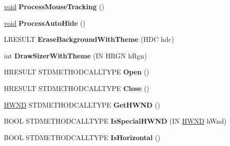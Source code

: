 \begin{DoxyCompactItemize}
\item 
\mbox{\label{class_c_tray_window_a78c47da209667ee22aa8f37245e79d9c}} 
\hyperlink{interfacevoid}{void} {\bfseries Process\+Mouse\+Tracking} ()
\item 
\mbox{\label{class_c_tray_window_af234aabaad01e460a1d97850421ccffd}} 
\hyperlink{interfacevoid}{void} {\bfseries Process\+Auto\+Hide} ()
\item 
\mbox{\label{class_c_tray_window_a6b91f23e171b0f9e7dc3ec6593c77f3f}} 
L\+R\+E\+S\+U\+LT {\bfseries Erase\+Background\+With\+Theme} (H\+DC hdc)
\item 
\mbox{\label{class_c_tray_window_a2fc9c57257b6348dae455052c73c55e5}} 
int {\bfseries Draw\+Sizer\+With\+Theme} (IN H\+R\+GN h\+Rgn)
\item 
\mbox{\label{class_c_tray_window_a8c18e7cf201551bcae86eff56916e9b9}} 
H\+R\+E\+S\+U\+LT S\+T\+D\+M\+E\+T\+H\+O\+D\+C\+A\+L\+L\+T\+Y\+PE {\bfseries Open} ()
\item 
\mbox{\label{class_c_tray_window_a97f14d3b01f3b36c2fc12f6f205ae5ab}} 
H\+R\+E\+S\+U\+LT S\+T\+D\+M\+E\+T\+H\+O\+D\+C\+A\+L\+L\+T\+Y\+PE {\bfseries Close} ()
\item 
\mbox{\label{class_c_tray_window_a2a4bae5fecc2b7fa50a40260f62a0af1}} 
\hyperlink{interfacevoid}{H\+W\+ND} S\+T\+D\+M\+E\+T\+H\+O\+D\+C\+A\+L\+L\+T\+Y\+PE {\bfseries Get\+H\+W\+ND} ()
\item 
\mbox{\label{class_c_tray_window_acb519ca41e849764b02a019a616f4d17}} 
B\+O\+OL S\+T\+D\+M\+E\+T\+H\+O\+D\+C\+A\+L\+L\+T\+Y\+PE {\bfseries Is\+Special\+H\+W\+ND} (IN \hyperlink{interfacevoid}{H\+W\+ND} h\+Wnd)
\item 
\mbox{\label{class_c_tray_window_a3986c53a6d4cc9e150600b764cc2a7f3}} 
B\+O\+OL S\+T\+D\+M\+E\+T\+H\+O\+D\+C\+A\+L\+L\+T\+Y\+PE {\bfseries Is\+Horizontal} ()
\item 
\mbox{\label{class_c_tray_window_a7e02278b777f221d8cc2aeac6e83d42a}} 

\end{DoxyCompactItemize}
